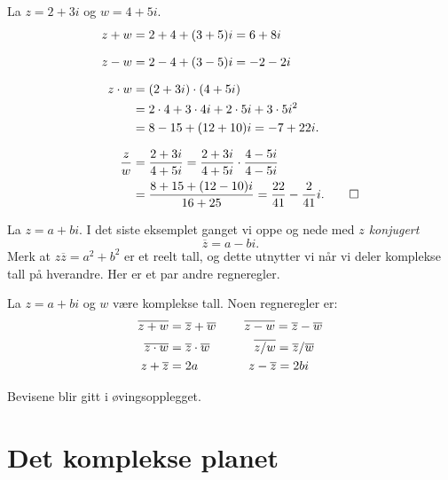 \begin{ex}
La $z=2+3i$ og $w=4+5i$. 
\begin{align*}
z+w&=2+4+(3+5)i=6+8i \\[7pt]
z-w&=2-4+(3-5)i=-2-2i \\[7pt]
z\cdot w&=(2+3i)\cdot(4+5i)\\&=2\cdot 4+3\cdot 4i+2\cdot 5i+3\cdot 5 i^2\\&=8-15+(12+10)i=-7+22i.\\[7pt]
\frac{z}{w}&=\frac{2+3i}{4+5i}=\frac{2+3i}{4+5i}\cdot\frac{4-5i}{4-5i}\\&=\frac{8+15+(12-10)i}{16+25}=\frac{22}{41}-\frac{2}{41}i. \qedhere
\end{align*}
\end{ex}
La $z=a+bi$. I det siste eksemplet 
ganget vi oppe og nede med \emph{$z$ konjugert}
\[
\overline z =a-bi.
\]
Merk at $z\overline z=a^2+b^2$ er et reelt tall, 
 og dette utnytter vi når vi deler komplekse tall på hverandre. 
Her  er et par andre regneregler. 
\begin{thm}
La $z=a+bi$ og $w$ være komplekse tall. Noen regneregler er:
\begin{align*}
\overline{z+w}&=\overline{z} + \overline{w} \hspace{.8cm}
\overline{z-w}=\overline{z} - \overline{w} \\
\overline{z\cdot w}&=\overline{z} \cdot \overline{w} \hspace{1.25cm}
\overline{z/ w}=\overline{z} / \overline{w} \\
z+\overline{z}&=2a  \hspace{1.43cm}
z-\overline{z}=2bi
\end{align*}
\end{thm}
\noindent Bevisene blir gitt i øvingsopplegget.


\section*{Det komplekse planet}

